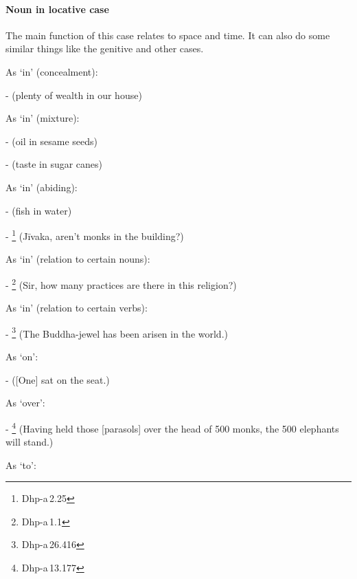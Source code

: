 \paragraph*{Noun in locative case} The main function of this case relates to space and time. It can also do some similar things like the genitive and other cases.
\begin{compactenum}[(1)]
\item As `in' (concealment):\par
-  (plenty of wealth in our house)\par
\item As `in' (mixture):\par
-  (oil in sesame seeds)\par
-  (taste in sugar canes)\par
\item As `in' (abiding):\par
-  (fish in water)\par
- \footnote{Dhp-a\,2.25} (J\=ivaka, aren't monks in the building?)\par
\item As `in' (relation to certain nouns):\par
- \footnote{Dhp-a\,1.1} (Sir, how many practices are there in this religion?)\par
\item As `in' (relation to certain verbs):\par
- \footnote{Dhp-a\,26.416} (The Buddha-jewel has been arisen in the world.)\par
\item As `on':\par
-  ([One] sat on the seat.)\par
\item As `over':\par
- \footnote{Dhp-a\,13.177} (Having held those [parasols] over the head of 500 monks, the 500 elephants will stand.)\par
\item As `to':\par

\end{compactenum}
